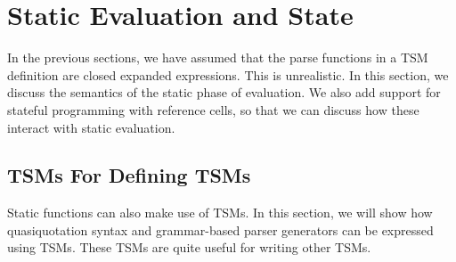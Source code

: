 \chapter{Static Evaluation and State}
In the previous sections, we have assumed that the parse functions in a TSM definition are closed expanded expressions. This is unrealistic. In this section, we discuss the semantics of the static phase of evaluation. We also add support for stateful programming with reference cells, so that we can discuss how these interact with static evaluation.

\section{TSMs For Defining TSMs}\label{sec:tsms-for-tsms}
Static functions can also make use of TSMs. In this section, we will show how quasiquotation syntax and grammar-based parser generators can be expressed using TSMs. These TSMs are quite useful for writing other TSMs.
